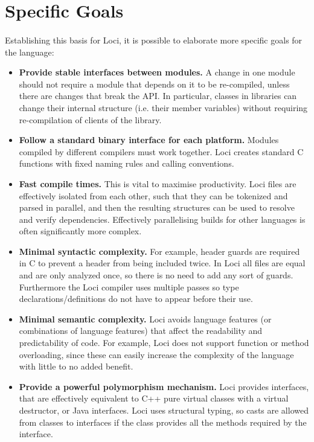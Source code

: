 \documentclass[12pt,twoside,notitlepage]{report}
\begin{document}
\section{Specific Goals}

\paragraph{}
Establishing this basis for Loci, it is possible to elaborate more specific goals for the language:

\begin{itemize}
\item \textbf{Provide stable interfaces between modules.} A change in one module should not require a module that depends on it to be re-compiled, unless there are changes that break the API. In particular, classes in libraries can change their internal structure (i.e. their member variables) without requiring re-compilation of clients of the library.
\item \textbf{Follow a standard binary interface for each platform.} Modules compiled by different compilers must work together. Loci creates standard C functions with fixed naming rules and calling conventions.
\item \textbf{Fast compile times.} This is vital to maximise productivity. Loci files are effectively isolated from each other, such that they can be tokenized and parsed in parallel, and then the resulting structures can be used to resolve and verify dependencies. Effectively parallelising builds for other languages is often significantly more complex.
\item \textbf{Minimal syntactic complexity.} For example, header guards are required in C to prevent a header from being included twice. In Loci all files are equal and are only analyzed once, so there is no need to add any sort of guards. Furthermore the Loci compiler uses multiple passes so type declarations/definitions do not have to appear before their use.
\item \textbf{Minimal semantic complexity.} Loci avoids language features (or combinations of language features) that affect the readability and predictability of code. For example, Loci does not support function or method overloading, since these can easily increase the complexity of the language with little to no added benefit.
\item \textbf{Provide a powerful polymorphism mechanism.} Loci provides interfaces, that are effectively equivalent to C++ pure virtual classes with a virtual destructor, or Java interfaces. Loci uses structural typing, so casts are allowed from classes to interfaces if the class provides all the methods required by the interface.
\end{itemize}
\end{document}
